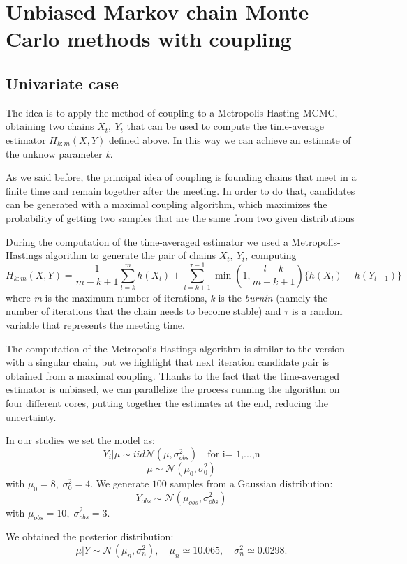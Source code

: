 \documentclass[11pt,a4paper,oneside]{report}
\begin{document}
\section{Unbiased Markov chain Monte Carlo methods with coupling}

\subsection{Univariate case}

The idea is to apply the method of coupling to a Metropolis-Hasting MCMC, obtaining two chains ${X_t}, \: {Y_t}$ that can be used to compute the time-average estimator $H_{k:m}(X,Y)$ defined above. In this way we can achieve an estimate of the unknow parameter \emph{k}.

As we said before, the principal idea of coupling is founding chains that meet in a finite time and remain together after the meeting. In order to do that, candidates can be generated with a maximal coupling algorithm, which maximizes the probability of getting two samples that are the same from two given distributions

During the computation of the time-averaged estimator we used  a Metropolis-Hastings algorithm to generate the pair of chains ${X_t}, \: {Y_t}$, computing 
$$ H_{k:m}(X,Y)
= \frac{1}{m-k+1}\sum_{l=k}^{m}h(X_l) 
+ \sum_{l=k+1}^{\tau -1}\min(1, \frac{l-k}{m-k+1})\{h(X_l)-h(Y_{l-1})\} 
$$
where \emph{m} is the maximum number of iterations, \emph{k} is the \emph{burnin} (namely the number of iterations that the chain needs to become stable) and $\tau$ is a random variable that represents the meeting time.

The computation of the Metropolis-Hastings algorithm is similar to the version with a singular chain, but we highlight that next iteration candidate pair is obtained from a maximal coupling.
Thanks to the fact that the time-averaged estimator is unbiased, we can parallelize the process running the algorithm on four different cores, putting together the estimates at the end, reducing the uncertainty. 

In our studies we set the model as:
$$ Y_i | \mu \sim{iid} \mathcal{N}(\mu, \sigma_{obs} ^2) \quad \text{for i= 1,...,n} $$
$$ \mu  \sim \mathcal{N}(\mu_0, \sigma_0^2)$$
with $\mu_0 = 8, \; \sigma^2_0 = 4$.
We generate $100$ samples from a Gaussian distribution:
$$
Y_{obs} \sim \mathcal{N}(\mu_{obs}, \sigma_{obs} ^2)
$$
with
$
\mu_{obs} = 10, \;
\sigma_{obs} ^2 = 3
$.

We obtained the posterior distribution:
$$  
	\mu | Y \sim \mathcal{N}(\mu_n, \sigma^2_n), 
	\quad \mu_n  \simeq 10.065,
	\quad \sigma^2_n \simeq 0.0298.
$$
\end{document}
